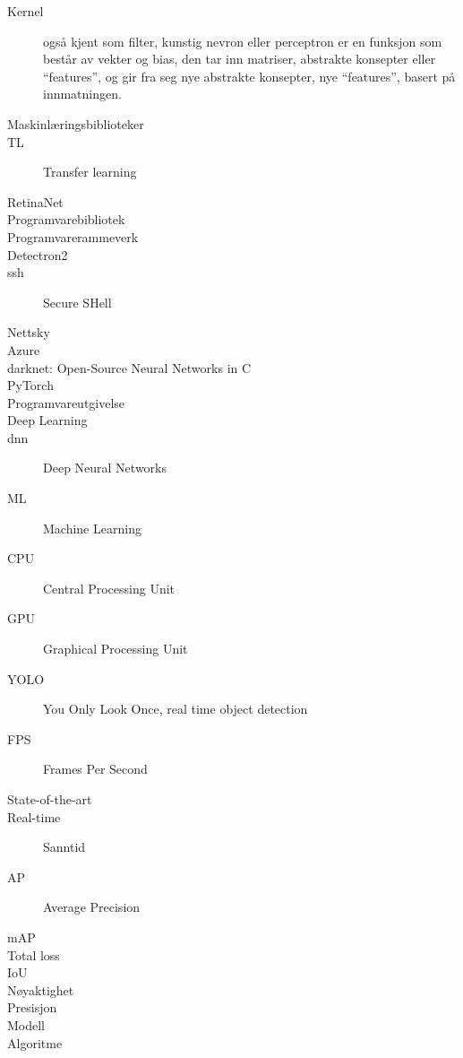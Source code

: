 \begin{description}
\item[Kernel] også kjent som filter, kunstig nevron eller perceptron er en funksjon som består av vekter og bias, den tar inn matriser, abstrakte konsepter eller ``features'', og gir fra seg nye abstrakte konsepter, nye ``features'', basert på innmatningen.
\item[Maskinlæringsbiblioteker]
\item[TL] Transfer learning
\item[RetinaNet]
\item[Programvarebibliotek]
\item[Programvarerammeverk]
\item[Detectron2]
\item[ssh] Secure SHell
\item[Nettsky]
\item[Azure]
\item[darknet: Open-Source Neural Networks in C]
\item[PyTorch]
\item[Programvareutgivelse]
\item[Deep Learning]
\item[dnn] Deep Neural Networks
\item[ML] Machine Learning
\item[CPU] Central Processing Unit
\item[GPU] Graphical Processing Unit
\item[YOLO] You Only Look Once, real time object detection
\item[FPS] Frames Per Second
\item[State-of-the-art] 
\item[Real-time] Sanntid
\item[AP] Average Precision
\item[mAP] 
\item[Total loss]
\item[IoU] 
\item[Nøyaktighet] 
\item[Presisjon] 
\item[Modell] 
\item[Algoritme]


\end{description}